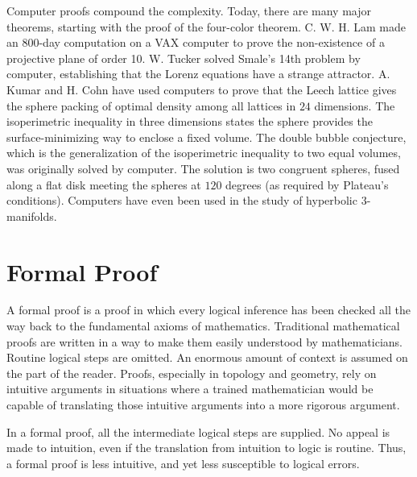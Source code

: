 \documentclass{llncs}
\begin{document}
Computer proofs 
compound the complexity. %
Today, there are many major theorems, starting with the proof
of the four-color theorem.
C. W. H. Lam made an 800-day computation on a VAX computer to
prove the non-existence of a projective plane of order 10.
 W. Tucker solved Smale's 14th problem by computer, establishing
that the Lorenz equations have a strange attractor. 
A. Kumar and H. Cohn have used computers to prove 
that the Leech lattice gives
the sphere packing of optimal density among all lattices in $24$
dimensions.
The isoperimetric inequality in three dimensions states the
sphere provides the surface-minimizing way to enclose a fixed volume.
The double bubble conjecture, which is the generalization of
the isoperimetric inequality to two equal volumes, was originally solved
by computer.  The solution is two congruent spheres, fused along
a flat disk meeting the spheres at $120$ degrees (as required
by Plateau's conditions).
Computers have even been used in the study of hyperbolic $3$-manifolds.
%
 


\section{Formal Proof}

A formal proof is a proof in which every logical inference has
been checked all the way back to the fundamental axioms of mathematics.
Traditional mathematical proofs are written in a way to make them easily understood by mathematicians. Routine logical steps are omitted. An enormous amount of context is assumed on the part of the reader. Proofs, especially in topology and geometry, rely on intuitive arguments in situations where a trained mathematician would be capable of translating those intuitive arguments into a more rigorous argument.

In a formal proof, all the intermediate logical steps are supplied. No appeal is made to intuition, even if the translation from intuition to logic is routine. Thus, a formal proof is less intuitive, and yet less susceptible to logical errors.
\end{document}
